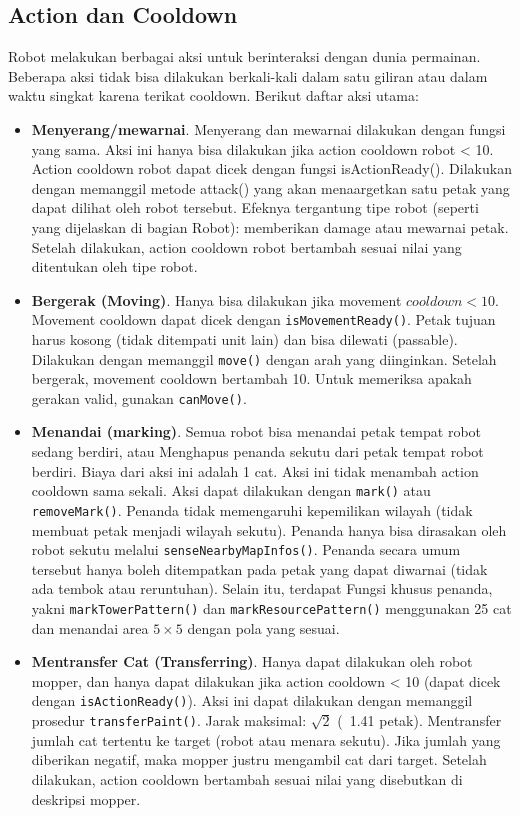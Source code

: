 \subsection{Action dan Cooldown}
Robot melakukan berbagai aksi untuk berinteraksi dengan dunia permainan. Beberapa aksi tidak bisa dilakukan berkali-kali dalam satu giliran atau dalam waktu singkat karena terikat cooldown. Berikut daftar aksi utama:
\begin{itemize}
    \item \textbf{Menyerang/mewarnai}. Menyerang dan mewarnai dilakukan dengan fungsi yang sama. Aksi ini hanya bisa dilakukan jika action cooldown robot < 10. Action cooldown robot dapat dicek dengan fungsi isActionReady(). Dilakukan dengan memanggil metode attack() yang akan menaargetkan satu petak yang dapat dilihat oleh robot tersebut. Efeknya tergantung tipe robot (seperti yang dijelaskan di bagian Robot): memberikan damage atau mewarnai petak. Setelah dilakukan, action cooldown robot bertambah sesuai nilai yang ditentukan oleh tipe robot.
    \item \textbf{Bergerak (Moving)}. Hanya bisa dilakukan jika movement $cooldown < 10$. Movement cooldown dapat dicek dengan \texttt{isMovementReady()}. Petak tujuan harus kosong (tidak ditempati unit lain) dan bisa dilewati (passable). Dilakukan dengan memanggil \texttt{move()} dengan arah yang diinginkan. Setelah bergerak, movement cooldown bertambah 10. Untuk memeriksa apakah gerakan valid, gunakan \texttt{canMove()}.
    \item \textbf{Menandai (marking)}. Semua robot bisa menandai petak tempat robot sedang berdiri, atau Menghapus penanda sekutu dari petak tempat robot berdiri. Biaya dari aksi ini adalah 1 cat. Aksi ini tidak menambah action cooldown sama sekali. Aksi dapat dilakukan dengan \texttt{mark()} atau \texttt{removeMark()}. Penanda tidak memengaruhi kepemilikan wilayah (tidak membuat petak menjadi wilayah sekutu). Penanda hanya bisa dirasakan oleh robot sekutu melalui \texttt{senseNearbyMapInfos()}. Penanda secara  umum tersebut hanya boleh ditempatkan pada petak yang dapat diwarnai (tidak ada tembok atau reruntuhan). Selain itu, terdapat Fungsi khusus penanda, yakni \texttt{markTowerPattern()} dan \texttt{markResourcePattern()} menggunakan 25 cat dan menandai area $5 \times 5$ dengan pola yang sesuai.
    \item \textbf{Mentransfer Cat (Transferring)}. Hanya dapat dilakukan oleh robot mopper, dan hanya dapat dilakukan jika action cooldown < 10 (dapat dicek dengan \texttt{isActionReady()}). Aksi ini dapat dilakukan dengan memanggil prosedur \texttt{transferPaint()}. Jarak maksimal: $\sqrt{2}$ (~1.41 petak). Mentransfer jumlah cat tertentu ke target (robot atau menara sekutu). Jika jumlah yang diberikan negatif, maka mopper justru mengambil cat dari target. Setelah dilakukan, action cooldown bertambah sesuai nilai yang disebutkan di deskripsi mopper.

\end{itemize}

